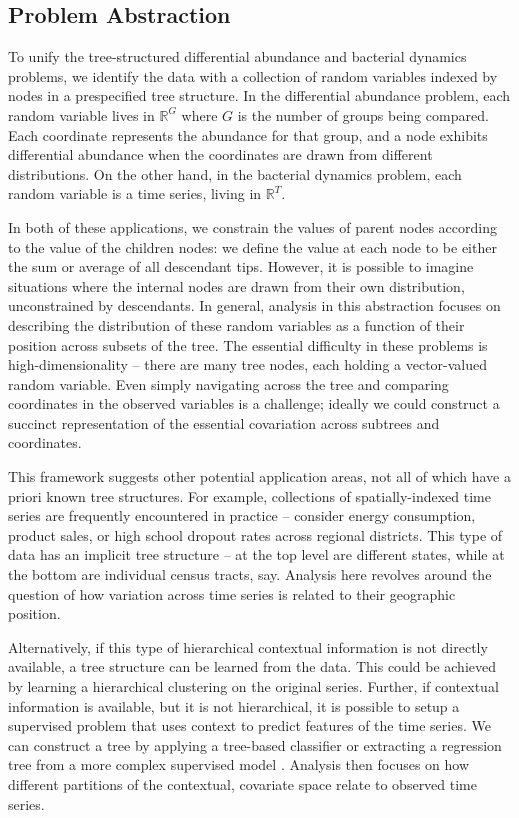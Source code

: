 \subsection{Problem Abstraction}\label{problem-abstraction}

To unify the tree-structured differential abundance and bacterial dynamics
problems, we identify the data with a collection of random variables indexed by
nodes in a prespecified tree structure. In the differential abundance problem,
each random variable lives in $\mathbb{R}^{G}$ where $G$ is the number of
groups being compared. Each coordinate represents the abundance for that group,
and a node exhibits differential abundance when the coordinates are drawn from
different distributions. On the other hand, in the bacterial dynamics problem,
each random variable is a time series, living in $\mathbb{R}^{T}$.

In both of these applications, we constrain the values of parent nodes according
to the value of the children nodes: we define the value at each node to be
either the sum or average of all descendant tips. However, it is possible to
imagine situations where the internal nodes are drawn from their own
distribution, unconstrained by descendants. In general, analysis in this
abstraction focuses on describing the distribution of these random variables as
a function of their position across subsets of the tree. The essential
difficulty in these problems is high-dimensionality -- there are many tree
nodes, each holding a vector-valued random variable. Even simply navigating
across the tree and comparing coordinates in the observed variables is a
challenge; ideally we could construct a succinct representation of the essential
covariation across subtrees and coordinates.

This framework suggests other potential application areas, not all of which have
a priori known tree structures. For example, collections of spatially-indexed
time series are frequently encountered in practice -- consider energy
consumption, product sales, or high school dropout rates across regional
districts. This type of data has an implicit tree structure -- at the top level
are different states, while at the bottom are individual census tracts, say.
Analysis here revolves around the question of how variation across time series
is related to their geographic position.

Alternatively, if this type of hierarchical contextual information is not
directly available, a tree structure can be learned from the data. This could be
achieved by learning a hierarchical clustering on the original series. Further,
if contextual information is available, but it is not hierarchical, it is
possible to setup a supervised problem that uses context to predict features of
the time series. We can construct a tree by applying a tree-based classifier
\citep{breiman1984classification} or extracting a regression tree from a more
complex supervised model \citep{boz2002extracting,saito2002extracting}. Analysis
then focuses on how different partitions of the contextual, covariate space
relate to observed time series.

